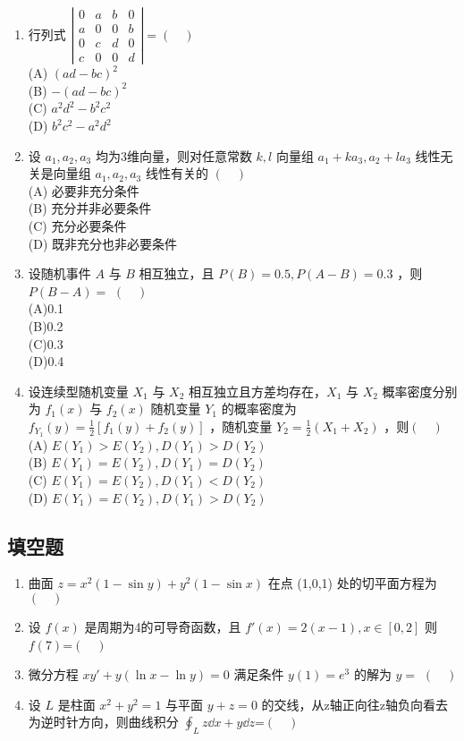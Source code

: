 \begin{enumerate}
\item 行列式 $ \left|\begin{array}{llll}0 & a & b & 0 \\ a & 0 & 0 & b \\ 0 & c & d & 0 \\ c & 0 & 0 & d\end{array}\right|=(\quad)$\\
(A) $(ad-bc)^2$\\
(B) $-(ad-bc)^2$\\
(C) $a^2d^2-b^2c^2$\\
(D) $b^2c^2-a^2d^2$
\item 设 $a_1,a_2,a_3$ 均为3维向量，则对任意常数 $k,l$ 向量组 $a_1+ka_3,a_2+la_3$ 线性无关是向量组 $a_1,a_2,a_3$ 线性有关的 $(\quad)$\\
(A) 必要非充分条件\\
(B) 充分并非必要条件\\
(C) 充分必要条件\\
(D) 既非充分也非必要条件
\item 设随机事件 $A$ 与 $B$ 相互独立，且 $P(B)=0.5,P(A-B)=0.3$ ，则$P(B-A)=$ $(\quad)$\\
(A)0.1\\
(B)0.2\\
(C)0.3\\
(D)0.4
\item 设连续型随机变量 $X_1$ 与 $X_2$ 相互独立且方差均存在，$X_1$  与 $X_2$ 概率密度分别为 $f_1(x)$ 与 $f_2(x)$ 随机变量 $Y_1$ 的概率密度为 $f_{Y_1}(y)=\frac{1}{2}[f_1(y)+f_2(y)]$ ，随机变量 $Y_2=\frac{1}{2}(X_1+X_2)$ ，则$(\quad)$\\
(A) $E(Y_1)>E(Y_2),D(Y_1)>D(Y_2)$\\
(B) $E(Y_1)=E(Y_2),D(Y_1)=D(Y_2)$\\
(C) $E(Y_1)=E(Y_2),D(Y_1)<D(Y_2)$\\
(D) $E(Y_1)=E(Y_2),D(Y_1)>D(Y_2)$

\end{enumerate}
\subsection{填空题}
\begin{enumerate}
\item 曲面 $z=x^2(1-\sin y)+y^2(1-\sin x)$  在点 (1,0,1) 处的切平面方程为$(\quad)$
\item 设 $f(x)$ 是周期为4的可导奇函数，且 $f'(x)=2(x-1),x \in [0,2]$  则 $f(7)$=$(\quad)$
\item 微分方程 $xy'+y(\ln x-\ln y)=0$ 满足条件 $y(1)=e^3$ 的解为 $y=$ $(\quad)$
\item 设 $L$ 是柱面 $x^2+y^2=1$ 与平面 $y+z=0$ 的交线，从z轴正向往z轴负向看去为逆时针方向，则曲线积分 $\displaystyle \oint_L z\dd{x}+y\dd{z}$=$(\quad)$
\end{enumerate}
